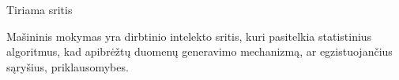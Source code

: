  \begin{frame}[c]{Tiriama sritis}
 
\setlength{\parindent}{10ex} Mašininis mokymas yra dirbtinio intelekto sritis, kuri pasitelkia statistinius algoritmus, kad apibrėžtų duomenų generavimo mechanizmą, ar egzistuojančius sąryšius, priklausomybes. 

 \end{frame}